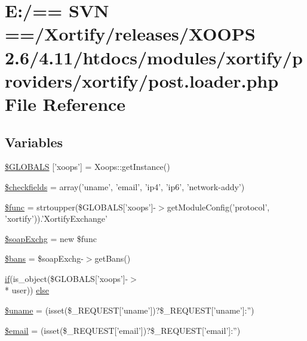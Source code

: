 \hypertarget{xortify_2post_8loader_8php}{\section{E\-:/== S\-V\-N ==/\-Xortify/releases/\-X\-O\-O\-P\-S 2.6/4.11/htdocs/modules/xortify/providers/xortify/post.loader.\-php File Reference}
\label{xortify_2post_8loader_8php}
}
\subsection*{Variables}
\begin{DoxyCompactItemize}
\item 
\hyperlink{xortify_2post_8loader_8php_adaeadb8f91232ad6dbd52f394104cd19}{\$\-G\-L\-O\-B\-A\-L\-S} \mbox{[}'xoops'\mbox{]} = Xoops\-::get\-Instance()
\item 
\hyperlink{xortify_2post_8loader_8php_afaeb0aa23d13e417fcfa6b008f397c71}{\$checkfields} = array('uname', 'email', 'ip4', 'ip6', 'network-\/addy')
\item 
\hyperlink{xortify_2post_8loader_8php_aacfa30e81347998f3a6fd1903c2c05d3}{\$func} = strtoupper(\$G\-L\-O\-B\-A\-L\-S\mbox{[}'xoops'\mbox{]}-\/$>$get\-Module\-Config('protocol', 'xortify')).'Xortify\-Exchange'
\item 
\hyperlink{xortify_2post_8loader_8php_a566274d031ba42e22bf2b4fda50d0cf0}{\$soap\-Exchg} = new \$func
\item 
\hyperlink{xortify_2post_8loader_8php_a4e486549b335a8e8fe6eeb9c4aa0a17c}{\$bans} = \$soap\-Exchg-\/$>$get\-Bans()
\item 
\hyperlink{poll_2index_8php_ae404acbb304be6b6ac443de921697faf}{if}(is\-\_\-object(\$G\-L\-O\-B\-A\-L\-S\mbox{[}'xoops'\mbox{]}-\/$>$\\*
user)) \hyperlink{xortify_2post_8loader_8php_a05d5dfb2e997e7b1230ef56d742eb6c1}{else}
\item 
\hyperlink{xortify_2post_8loader_8php_a227a9443cabbe5e23cfc10c4371e09d1}{\$uname} = (isset(\$\-\_\-\-R\-E\-Q\-U\-E\-S\-T\mbox{[}'uname'\mbox{]})?\$\-\_\-\-R\-E\-Q\-U\-E\-S\-T\mbox{[}'uname'\mbox{]}\-:'')
\item 
\hyperlink{xortify_2post_8loader_8php_ad634f418b20382e2802f80532d76d3cd}{\$email} = (isset(\$\-\_\-\-R\-E\-Q\-U\-E\-S\-T\mbox{[}'email'\mbox{]})?\$\-\_\-\-R\-E\-Q\-U\-E\-S\-T\mbox{[}'email'\mbox{]}\-:'')
\end{DoxyCompactItemize}



